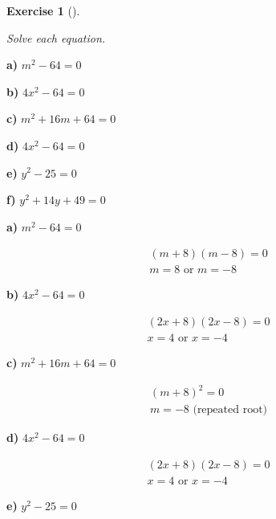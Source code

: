 \documentclass[
  letterpaper,
  DIV=11,
  numbers=noendperiod]{scrreprt}
\theoremstyle{definition}
\newtheorem{exercise}{Exercise}[chapter]
\theoremstyle{remark}
\begin{document}
\begin{exercise}[]\protect\hypertarget{exr-u6-10}{}\label{exr-u6-10}

\emph{Solve each equation.}

\textbf{a)} \(\displaystyle m^2 - 64 = 0\)

\textbf{b)} \(\displaystyle 4x^2 - 64 = 0\)

\textbf{c)} \(\displaystyle m^2 + 16m + 64 = 0\)

\textbf{d)} \(\displaystyle 4x^2 - 64 = 0\)

\textbf{e)} \(\displaystyle y^2 - 25 = 0\)

\textbf{f)} \(\displaystyle y^2 + 14y + 49 = 0\)

\begin{tcolorbox}[enhanced jigsaw, opacitybacktitle=0.6, coltitle=black, arc=.35mm, colframe=quarto-callout-tip-color-frame, colback=white, bottomrule=.15mm, left=2mm, colbacktitle=quarto-callout-tip-color!10!white, titlerule=0mm, opacityback=0, title=\textcolor{quarto-callout-tip-color}{\faLightbulb}\hspace{0.5em}{🔍 View Solutions}, leftrule=.75mm, breakable, rightrule=.15mm, bottomtitle=1mm, toptitle=1mm, toprule=.15mm]

\textbf{a)} \(\displaystyle m^2 - 64 = 0\)

\begin{align*}
(m + 8)(m - 8) = 0 \\ m = 8 \text{ or } m = -8
\end{align*}

\textbf{b)} \(\displaystyle 4x^2 - 64 = 0\)

\begin{align*}
(2x + 8)(2x - 8) = 0 \\ x = 4 \text{ or } x = -4
\end{align*}

\textbf{c)} \(\displaystyle m^2 + 16m + 64 = 0\)

\begin{align*}
(m + 8)^2 = 0 \\ m = -8 \text{ (repeated root)}
\end{align*}

\textbf{d)} \(\displaystyle 4x^2 - 64 = 0\)

\begin{align*}
(2x + 8)(2x - 8) = 0 \\ x = 4 \text{ or } x = -4
\end{align*}

\textbf{e)} \(\displaystyle y^2 - 25 = 0\)


\end{tcolorbox}
\end{exercise}
\end{document}
